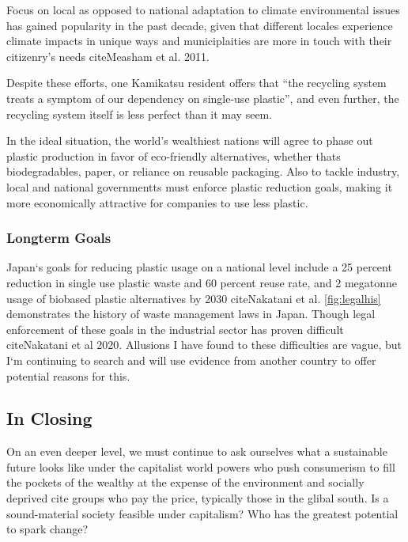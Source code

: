 \documentclass{book}\usepackage{knitr}
\begin{document}
Focus on local as opposed to national adaptation to climate environmental issues has gained popularity in the past decade, given that different locales experience climate impacts in unique ways and municiplaities are more in touch with their citizenry's needs citeMeasham et al. 2011.  

 Despite these efforts, one Kamikatsu resident offers that “the recycling system treats a symptom of our dependency on single-use plastic”, and even further, the recycling system itself is less perfect than it may seem. 
 
 In the ideal situation, the world's wealthiest nations will agree to phase out plastic production in favor of eco-friendly alternatives, whether thats biodegradables, paper, or reliance on reusable packaging. Also to tackle industry, local and national governmentts must enforce plastic reduction goals, making it more economically attractive for companies to use less plastic. 
 
 \subsubsection{Longterm Goals}
 
 Japan`s goals for reducing plastic usage on a  national level include a 25 percent reduction in single use plastic waste and 60 percent reuse rate, and  2 megatonne usage of biobased plastic alternatives by 2030 citeNakatani et al. \ref{fig:legalhis} demonstrates the history of waste management laws in Japan. Though legal enforcement of these goals in the industrial sector has proven difficult citeNakatani et al 2020. Allusions I have found to these difficulties are vague, but I`m continuing to search and will use evidence from another country to offer potential reasons for this. 

\subsection{In Closing}

On an even deeper level, we must continue to ask ourselves what a sustainable future looks like under the capitalist world powers who push  consumerism to fill the pockets of the wealthy at the expense of the environment and socially deprived cite groups who pay the price, typically those in the glibal south. Is a sound-material society feasible under capitalism? Who has the greatest potential to spark change?
 
\end{document}
